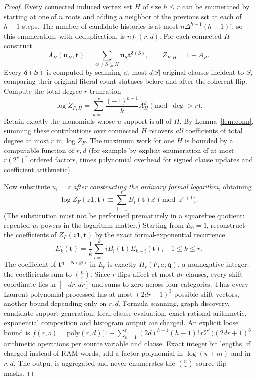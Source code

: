 \documentclass[11pt]{article}
\newcommand{\vv}[1]{\boldsymbol{#1}}
\begin{document}
\begin{proof}
Every connected induced vertex set $H$ of size $h\le r$ can be enumerated by starting at one of $n$ roots and adding a neighbor of the previous set at each of $h-1$ steps. The number of candidate histories is at most $n\Delta^{h-1}(h-1)!$, so this enumeration, with deduplication, is $n f_1(r,d)$. For each connected $H$ construct
\[A_H(\vv u_H,\vv t)=\sum_{\varnothing\ne S\subseteq H}\vv u_S\vv t^{\boldsymbol\delta(S)},\qquad Z_{F,H}=1+A_H.\]
Every $\boldsymbol\delta(S)$ is computed by scanning at most $d|S|$ original clauses incident to $S$, comparing their original literal-count statuses before and after the coherent flip. Compute the total-degree-$r$ truncation
\[\log Z_{F,H}=\sum_{k=1}^r\frac{(-1)^{k-1}}{k}A_H^k\pmod{\deg>r}.\]
Retain exactly the monomials whose $u$-support is all of $H$. By Lemma~\ref{lem:conn}, summing these contributions over connected $H$ recovers \emph{all} coefficients of total degree at most $r$ in $\log Z_F$. The maximum work for one $H$ is bounded by a computable function of $r,d$ (for example by explicit enumeration of at most $r(2^r)^r$ ordered factors, times polynomial overhead for signed clause updates and coefficient arithmetic).

Now substitute $u_i=z$ \emph{after constructing the ordinary formal logarithm}, obtaining
\[\log Z_F(z\vv1,\vv t)\equiv\sum_{i=1}^rB_i(\vv t)z^i\pmod{z^{r+1}}.\]
(The substitution must not be performed prematurely in a squarefree quotient: repeated $u_i$ powers in the logarithm matter.) Starting from $E_0=1$, reconstruct the coefficients of $Z_F(z\vv1,\vv t)$ by the exact formal-exponential recurrence
\begin{equation}\label{eq:exp}
E_k(\vv t)=\frac1k\sum_{i=1}^k i B_i(\vv t)E_{k-i}(\vv t),\quad 1\le k\le r.
\end{equation}
The coefficient of $\vv t^{\vv q-\vv N(\varnothing)}$ in $E_r$ is exactly $H_r(F,a;\vv q)$, a nonnegative integer; the coefficients sum to $\binom nr$. Since $r$ flips affect at most $dr$ clauses, every shift coordinate lies in $[-dr,dr]$ and sums to zero across four categories. Thus every Laurent polynomial processed has at most $(2dr+1)^3$ possible shift vectors, another bound depending only on $r,d$. Formula scanning, graph discovery, candidate support generation, local clause evaluation, exact rational arithmetic, exponential composition and histogram output are charged. An explicit loose bound is $f(r,d)=\mathrm{poly}(r,d)\bigl(1+\sum_{h=1}^r(2d)^{h-1}(h-1)!\,r2^{r^2}\bigr)(2dr+1)^6$ arithmetic operations per source variable and clause. Exact integer bit lengths, if charged instead of RAM words, add a factor polynomial in $\log(n+m)$ and in $r,d$. The output is aggregated and never enumerates the $\binom nr$ source flip masks.
\end{proof}
\end{document}
